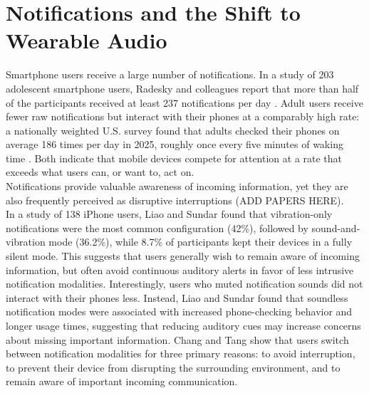 \section{Notifications and the Shift to Wearable Audio}
\label{sec:notifications_smartglasses}
Smartphone users receive a large number of notifications. In a study of 203 adolescent smartphone users, Radesky and colleagues report that more than half of the participants received at least 237 notifications per day \cite{URL_23_237NotificationsADay}. Adult users receive fewer raw notifications but interact with their phones at a comparably high rate: a nationally weighted U.S. survey found that adults checked their phones on average 186 times per day in 2025, roughly once every five minutes of waking time \cite{URL_CheckPhone186TimesADay}. Both indicate that mobile devices compete for attention at a rate that exceeds what users can, or want to, act on.\\
Notifications provide valuable awareness of incoming information, yet they are also frequently perceived as disruptive interruptions (ADD PAPERS HERE). \\
In a study of 138 iPhone users, Liao and Sundar \cite{Liao_22_MutedSmartphone} found that vibration-only notifications were the most common configuration (42\%), followed by sound-and-vibration mode (36.2\%), while 8.7\% of participants kept their devices in a fully silent mode. This suggests that users generally wish to remain aware of incoming information, but often avoid continuous auditory alerts in favor of less intrusive notification modalities. Interestingly, users who muted notification sounds did not interact with their phones less. Instead, Liao and Sundar found that soundless notification modes were associated with increased phone-checking behavior and longer usage times, suggesting that reducing auditory cues may increase concerns about missing important information.
Chang and Tang \cite{Chan_15_RingerMode} show that users switch between notification modalities for three primary reasons: to avoid interruption, to prevent their device from disrupting the surrounding environment, and to remain aware of important incoming communication. \\
